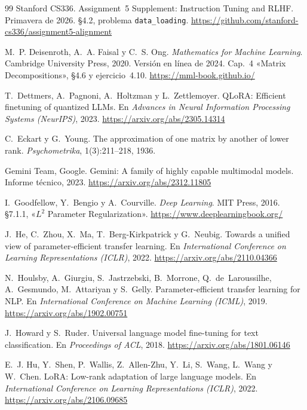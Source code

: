 \begin{thebibliography}{99}
Stanford CS336.
\newblock Assignment~5 Supplement: Instruction Tuning and RLHF.
\newblock Primavera de 2026. §4.2, problema \texttt{data\_\allowbreak loading}.
\newblock \url{https://github.com/stanford-cs336/assignment5-alignment}

M.~P. Deisenroth, A.~A. Faisal y C.~S. Ong.
\newblock \emph{Mathematics for Machine Learning}.
\newblock Cambridge University Press, 2020. Versión en línea de 2024.
\newblock Cap.~4 «Matrix Decompositions», §4.6 y ejercicio~4.10.
\newblock \url{https://mml-book.github.io/}

T.~Dettmers, A.~Pagnoni, A.~Holtzman y L.~Zettlemoyer.
\newblock QLoRA: Efficient finetuning of quantized LLMs.
\newblock En \emph{Advances in Neural Information Processing Systems (NeurIPS)}, 2023.
\newblock \url{https://arxiv.org/abs/2305.14314}

C.~Eckart y G.~Young.
\newblock The approximation of one matrix by another of lower rank.
\newblock \emph{Psychometrika}, 1(3):211--218, 1936.

Gemini Team, Google.
\newblock Gemini: A family of highly capable multimodal models.
\newblock Informe técnico, 2023.
\newblock \url{https://arxiv.org/abs/2312.11805}

I.~Goodfellow, Y.~Bengio y A.~Courville.
\newblock \emph{Deep Learning}.
\newblock MIT Press, 2016. §7.1.1, «$L^2$ Parameter Regularization».
\newblock \url{https://www.deeplearningbook.org/}

J.~He, C.~Zhou, X.~Ma, T.~Berg-Kirkpatrick y G.~Neubig.
\newblock Towards a unified view of parameter-efficient transfer learning.
\newblock En \emph{International Conference on Learning Representations (ICLR)}, 2022.
\newblock \url{https://arxiv.org/abs/2110.04366}

N.~Houlsby, A.~Giurgiu, S.~Jastrzebski, B.~Morrone, Q.~de~Laroussilhe, A.~Gesmundo, M.~Attariyan y S.~Gelly.
\newblock Parameter-efficient transfer learning for NLP.
\newblock En \emph{International Conference on Machine Learning (ICML)}, 2019.
\newblock \url{https://arxiv.org/abs/1902.00751}

J.~Howard y S.~Ruder.
\newblock Universal language model fine-tuning for text classification.
\newblock En \emph{Proceedings of ACL}, 2018.
\newblock \url{https://arxiv.org/abs/1801.06146}

E.~J. Hu, Y.~Shen, P.~Wallis, Z.~Allen-Zhu, Y.~Li, S.~Wang, L.~Wang y W.~Chen.
\newblock LoRA: Low-rank adaptation of large language models.
\newblock En \emph{International Conference on Learning Representations (ICLR)}, 2022.
\newblock \url{https://arxiv.org/abs/2106.09685}


\end{thebibliography}
